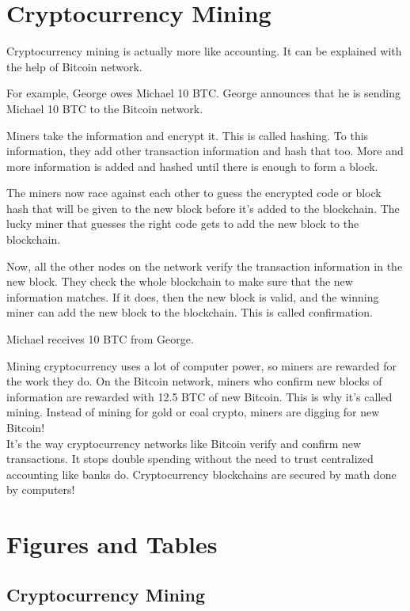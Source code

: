 \documentclass[9pt,twocolumn,twoside]{optica-suppl-materials}
\begin{document}
\section{Cryptocurrency Mining}
Cryptocurrency mining is actually more like accounting. It can be
explained with the help of Bitcoin network.\begin{condenseditemize}
    
\item For example,
George owes Michael 10 BTC. George announces that he is
sending Michael 10 BTC to the Bitcoin network.
\item Miners take the information and encrypt it. This is called
hashing. To this information, they add other transaction
information and hash that too. More and more information is
added and hashed until there is enough to form a block.
\item The miners now race against each other to guess the
encrypted code or block hash that will be given to the new
block before it’s added to the blockchain. The lucky miner
that guesses the right code gets to add the new block to the
blockchain.

\item Now, all the other nodes on the network verify the transaction
information in the new block. They check the whole
blockchain to make sure that the new information matches. If
it does, then the new block is valid, and the winning miner
can add the new block to the blockchain. This is called
confirmation.
\item Michael receives 10 BTC from George.
\end{condenseditemize}
Mining cryptocurrency uses a lot of computer power, so miners are
rewarded for the work they do. On the Bitcoin network, miners
who confirm new blocks of information are rewarded with 12.5
BTC of new Bitcoin. This is why it’s called mining. Instead of
mining for gold or coal crypto, miners are digging for new Bitcoin!\\
It’s the way cryptocurrency networks like Bitcoin verify and confirm
new transactions. It stops double spending without the need to
trust centralized accounting like banks do. Cryptocurrency
blockchains are secured by math done by computers!

\section{Figures and Tables}

\subsection{Cryptocurrency Mining}
\end{document}
